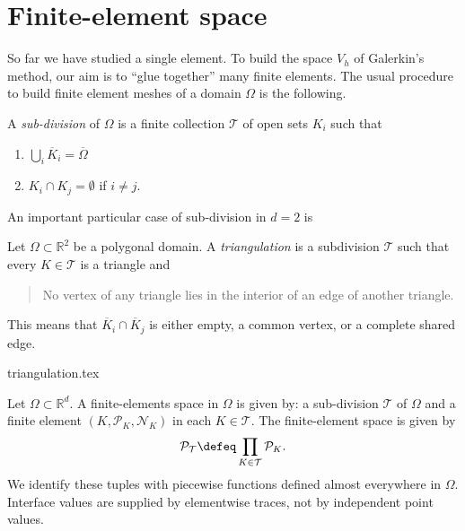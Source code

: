 \section{Finite-element space}
\label{sec:FEM finite-element space}

So far we have studied a single element. To build the space $V_h$ of Galerkin's method, our aim is to ``glue together'' many finite elements.
The usual procedure to build finite element meshes of a domain $\Omega$ is the following.
\begin{definition}
    A \emph{sub-division} of $\Omega$ is a finite collection $\mathcal T$ of open sets $K_i$ such that
    \begin{enumerate}
        \item $\bigcup_i \overline K_i = \overline \Omega$
        \item $K_i \cap K_j = \emptyset$ if $i \ne j$.
    \end{enumerate}
\end{definition}

An important particular case of sub-division in $d=2$ is
\begin{definition}[Triangulation]
    Let $\Omega \subset \mathbb R^2$ be a polygonal domain. A \emph{triangulation} is a subdivision $\mathcal T$ such that every $K \in \mathcal T$ is a triangle and
    \begin{quote}
        No vertex of any triangle lies in the interior of an edge of another triangle.
    \end{quote}
    This means that $\overline K_i \cap \overline K_j$ is either empty, a common vertex, or a complete shared edge.
\end{definition}
\begin{center}
    {triangulation.tex}
\end{center}

\begin{definition}
    Let $\Omega \subset \mathbb R^d$. A finite-elements space in $\Omega$ is given by: a sub-division $\mathcal T$ of $\Omega$ and a finite element $(K, \mathcal P_K, \mathcal N_K)$ in each $K \in \mathcal T$.
    The finite-element space is given by
    \begin{equation*}
        \mathcal P_{\mathcal T} \defeq \prod_{K\in\mathcal T}\mathcal P_K.
    \end{equation*}
    We identify these tuples with piecewise functions defined almost everywhere in $\Omega$. Interface values are supplied by elementwise traces, not by independent point values.
\end{definition}

